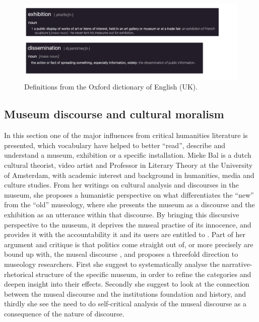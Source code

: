 \begin{figure}[H]
\includegraphics[width=14cm]{pictures/background/exh_diss.png}
\caption{Definitions from the Oxford dictionary of English (UK).}
\centering
\end{figure}

\subsection{Museum discourse and cultural moralism} 
In this section one of the major influences from critical humanities literature is presented, which vocabulary have helped to better “read”, describe and understand a museum, exhibition or a specific installation. Mieke Bal is a dutch cultural theorist, video artist and Professor in Literary Theory at the University of Amsterdam, with academic interest and background in humanities, media and culture studies. From her writings on cultural analysis and discourses in the museum, she proposes a humanistic perspective on what differentiates the “new” from the “old” museology, where she presents the museum as a discourse and the exhibition as an utterance within that discourse. By bringing this discursive perspective to the museum, it deprives the museal practise of its innocence, and provides it with the accountability it and its users are entitled to \autocite[p. 214]{Thi_book}. Part of her argument and critique is that politics come straight out of, or more precisely are bound up with, the museal discourse \autocite[p. 214]{Thi_book}, and proposes a threefold direction to museology researchers. First she suggest to systematically analyse the narrative-rhetorical structure of the specific museum, in order to refine the categories and deepen insight into their effects. Secondly she suggest to look at the connection between the museal discourse and the institutions foundation and history, and thirdly she see the need to do self-critical analysis of the museal discourse as a consequence of the nature of discourse. %

